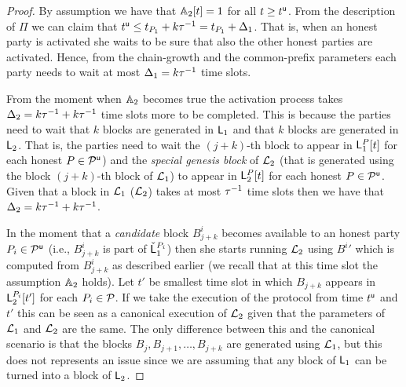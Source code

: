 \begin{proof}

By assumption we have that $\mathbb{A}_2[t]=1$ for all $t\geq t^{\mathsf{u}}$. From the description of $\Pi$ we can claim that $t^{\mathsf{u}} \leq t_{P_1}+k\tau^{-1}=t_{P_1}+\Delta_1$.
That is, when an honest party is activated she waits to be sure that also the other honest parties are activated. Hence, from the chain-growth and the common-prefix parameters
each party needs to wait at most $\Delta_1=k\tau^{-1}$ time slots.

From the moment when $\mathbb{A}_2$ becomes true the activation process takes $\Delta_2=k \tau^{-1} + k \tau^{-1}$  time slots more to be completed.
This is because the parties need to wait that $k$ blocks are generated in $\mathsf{L}_1$ and that $k$ blocks are generated in $\mathsf{L}_2$. 
That is, the parties need to wait the $(j+k)$-th block to appear in $\mathsf{L}_1^P[t]$ for each honest $P\in\mathcal{P}^\mathsf{u}$) and the \emph{special genesis block} of $\mathcal{L}_2$ (that is generated using the block $(j+k)$-th block of $\mathcal{L}_1$) to appear 
in $\mathsf{L}_2^P[t]$ for each honest $P\in\mathcal{P}^\mathsf{u}$. Given that a block in $\mathcal{L}_1$ ($\mathcal{L}_2$) takes at most $\tau^{-1}$ time slots then we have that $\Delta_2=k \tau^{-1} + k \tau^{-1}$.


In the moment that a \emph{candidate} block $B^i_{j+k}$ becomes available to an honest party $P_i\in\mathcal{P}^\mathsf{u}$ (i.e., $B^i_{j+k}$ is part of $\check {\mathsf{L}}_1^{P_i}$) then she starts running $\mathcal{L}_2$
using ${B^i}'$ which is computed from $B^i_{j+k}$ as described earlier (we recall that at this time slot the assumption $\mathbb{A}_2$ holds).
Let $t'$ be smallest time slot in which $B_{j+k}$ appears in $\mathsf{L}_2^{P_i}[t']$ for each $P_i\in\mathcal{P}$.
If we take the execution of the protocol from time $t^{\mathsf{u}}$ and $t'$ this can be seen as a canonical execution of $\mathcal{L}_2$ given
that the parameters of $\mathcal{L}_1$ and $\mathcal{L}_2$ are the same. The only difference between this and the canonical scenario is
that the blocks $B_{j}, B_{j+1},\dots, B_{j+k}$ are generated using $\mathcal{L}_1$, but this does not represents an issue since we are assuming that
any block of $\mathsf{L}_1$ can be turned into a block of $\mathsf{L}_2$. 




\end{proof}
